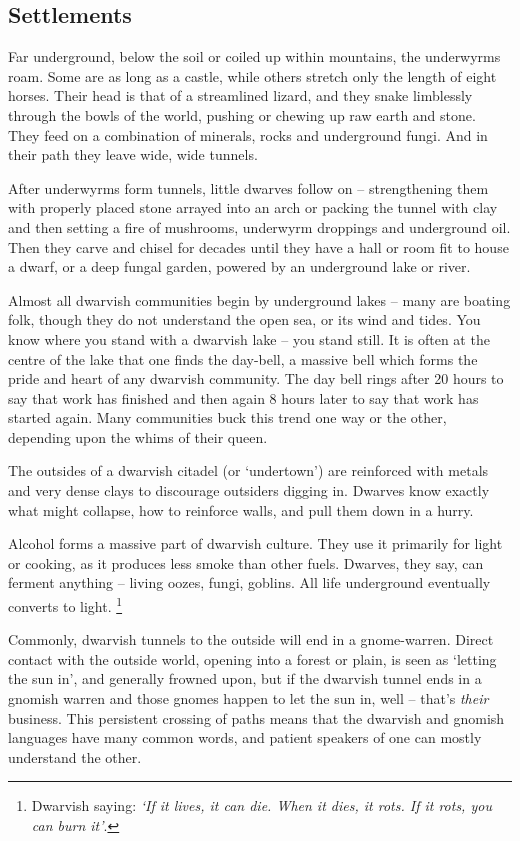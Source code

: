 \begin{multicols}{2}
\renewcommand\npcsymbol{\Dw}

\subsection{Settlements}

Far underground, below the soil or coiled up within mountains, the underwyrms roam.
Some are as long as a castle, while others stretch only the length of eight horses.
Their head is that of a streamlined lizard, and they snake limblessly through the bowls of the world, pushing or chewing up raw earth and stone.
They feed on a combination of minerals, rocks and underground fungi.
And in their path they leave wide, wide tunnels.

After underwyrms form tunnels, little dwarves follow on -- strengthening them with properly placed stone arrayed into an arch or packing the tunnel with clay and then setting a fire of mushrooms, underwyrm droppings and underground oil. Then they carve and chisel for decades until they have a hall or room fit to house a dwarf, or a deep fungal garden, powered by an underground lake or river.

Almost all dwarvish communities begin by underground lakes -- many are boating folk, though they do not understand the open sea, or its wind and tides. You know where you stand with a dwarvish lake -- you stand still. It is often at the centre of the lake that one finds the day-bell, a massive bell which forms the pride and heart of any dwarvish community. The day bell rings after 20 hours to say that work has finished and then again 8 hours later to say that work has started again. Many communities buck this trend one way or the other, depending upon the whims of their queen.

The outsides of a dwarvish citadel (or `undertown') are reinforced with metals and very dense clays to discourage outsiders digging in.
Dwarves know exactly what might collapse, how to reinforce walls, and pull them down in a hurry.

Alcohol forms a massive part of dwarvish culture.
They use it primarily for light or cooking, as it produces less smoke than other fuels.
Dwarves, they say, can ferment anything -- living oozes, fungi, goblins.
All life underground eventually converts to light.%
\footnote{Dwarvish saying: \textit{`If it lives, it can die. When it dies, it rots. If it rots, you can burn it'}.}

Commonly, dwarvish tunnels to the outside will end in a gnome-warren.
Direct contact with the outside world, opening into a forest or plain, is seen as `letting the sun in',
and generally frowned upon, but if the dwarvish tunnel ends in a gnomish warren and those gnomes happen to let the sun in, well -- that's \emph{their} business.
This persistent crossing of paths means that the dwarvish and gnomish languages have many common words, and patient speakers of one can mostly understand the other.


\end{multicols}
